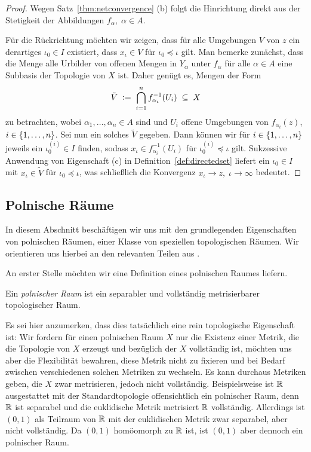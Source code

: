 \documentclass[../main/main.tex]{subfiles}
\begin{document}
	\begin{proof}
		Wegen Satz~\ref{thm:netconvergence} (b) folgt die Hinrichtung direkt aus der Stetigkeit der Abbildungen $f_\alpha, \; \alpha \in A$.
		
		Für die Rückrichtung möchten wir zeigen, dass für alle Umgebungen $V$ von $z$ ein derartiges $\iota_0 \in I$ existiert, dass $x_\iota \in V$ für $\iota_0 \preceq \iota$ gilt.
		Man bemerke zunächst, dass die Menge alle Urbilder von offenen Mengen in $Y_\alpha$ unter $f_\alpha$ für alle $\alpha \in A$ eine Subbasis der Topologie von $X$ ist.
		Daher genügt es, Mengen der Form
		\[ \tilde{V} \; \vcentcolon = \; \bigcap_{i=1}^{n} f_{\alpha_i}^{-1}(U_i) \; \subseteq \; X \]
		zu betrachten, wobei $\alpha_1, \dots, \alpha_n \in A$ sind und $U_i$ offene Umgebungen von $f_{\alpha_i}(z)$, $i \in \left\{1, \dots, n\right\}$.
		Sei nun ein solches $\tilde{V}$ gegeben. Dann können wir für $i \in \left\{1, \dots, n\right\}$ jeweils ein $\iota_0^{(i)} \in I$ finden, sodass $x_\iota \in f_{\alpha_i}^{-1}(U_i)$ für 
		$\iota_0^{(i)} \preceq \iota$ gilt. Sukzessive Anwendung von Eigenschaft (c) in Definition~\ref{def:directedset} liefert ein $\iota_0 \in I$ mit 
		$x_\iota \in \tilde{V}$ für $\iota_0 \preceq \iota$, was schließlich die Konvergenz $x_\iota \to z, \; \iota \to \infty$ bedeutet.
	\end{proof}
	
	\subsection{Polnische Räume}
	
	In diesem Abschnitt beschäftigen wir uns mit den grundlegenden Eigenschaften von polnischen Räumen, 
	einer Klasse von speziellen topologischen Räumen. 
	Wir orientieren uns hierbei an den relevanten Teilen aus \cite[Kapitel 4.14]{Simon.2015}.
	
	An erster Stelle möchten wir eine Definition eines polnischen Raumes liefern.
	
	\begin{Definition}
		Ein \emph{polnischer Raum} ist ein separabler und vollständig metrisierbarer topologischer Raum.
	\end{Definition}
	
	Es sei hier anzumerken, dass dies tatsächlich eine rein topologische Eigenschaft ist: Wir fordern für einen polnischen Raum $X$ nur die Existenz einer Metrik,
	die die Topologie von $X$ erzeugt und bezüglich der $X$ vollständig ist, möchten uns aber die Flexibilität
	bewahren, diese Metrik nicht zu fixieren und bei Bedarf zwischen verschiedenen solchen Metriken
	zu wechseln. Es kann durchaus Metriken geben, die $X$ zwar metrisieren, jedoch nicht vollständig.
	Beispielsweise ist $\mathbb{R}$ ausgestattet mit der Standardtopologie offensichtlich ein polnischer Raum,
	denn $\mathbb{R}$ ist separabel und die euklidische Metrik metrisiert $\mathbb{R}$ vollständig. 
	Allerdings ist $(0, 1)$ als Teilraum von $\mathbb{R}$ mit der euklidischen Metrik zwar separabel, aber nicht vollständig.
	Da $(0, 1)$ homöomorph zu $\mathbb{R}$ ist, ist $(0, 1)$ aber dennoch ein polnischer Raum.
	
\end{document}
